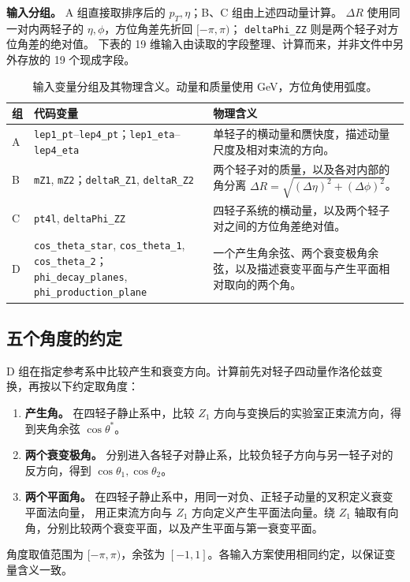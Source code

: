 \documentclass[11pt,a4paper,fontset=fandol,scheme=plain]{ctexart}
\begin{document}
\textbf{输入分组。} A 组直接取排序后的 $p_T,\eta$；B、C 组由上述四动量计算。
$\Delta R$ 使用同一对内两轻子的 $\eta,\phi$，方位角差先折回 $[-\pi,\pi)$；
\texttt{deltaPhi\_ZZ} 则是两个轻子对方位角差的绝对值。
下表的 19 维输入由读取的字段整理、计算而来，并非文件中另外存放的 19 个现成字段。
\begin{table}[H]
\caption{输入变量分组及其物理含义。动量和质量使用 GeV，方位角使用弧度。}
\label{tab:features}
\small
\renewcommand{\arraystretch}{1.12}
\begin{tabularx}{\linewidth}{@{}p{.05\linewidth}p{.43\linewidth}Y@{}}
\toprule
组 & 代码变量 & 物理含义 \\
\midrule
A & \texttt{lep1\_pt}--\texttt{lep4\_pt}；\texttt{lep1\_eta}--\texttt{lep4\_eta} &
单轻子的横动量和赝快度，描述动量尺度及相对束流的方向。 \\
B & \texttt{mZ1}, \texttt{mZ2}；\texttt{deltaR\_Z1}, \texttt{deltaR\_Z2} &
两个轻子对的质量，以及各对内部的角分离 $\Delta R=\sqrt{(\Delta\eta)^2+(\Delta\phi)^2}$。 \\
C & \texttt{pt4l}, \texttt{deltaPhi\_ZZ} &
四轻子系统的横动量，以及两个轻子对之间的方位角差绝对值。 \\
D & \texttt{cos\_theta\_star}, \texttt{cos\_theta\_1}, \texttt{cos\_theta\_2}；
\texttt{phi\_decay\_planes}, \texttt{phi\_production\_plane} &
一个产生角余弦、两个衰变极角余弦，以及描述衰变平面与产生平面相对取向的两个角。 \\
\bottomrule
\end{tabularx}
\end{table}
\subsection{五个角度的约定}
D 组在指定参考系中比较产生和衰变方向。计算前先对轻子四动量作洛伦兹变换，再按以下约定取角度：
\begin{enumerate}[leftmargin=1.7em,itemsep=3pt]
\item \textbf{产生角。} 在四轻子静止系中，比较 $Z_1$ 方向与变换后的实验室正束流方向，得到夹角余弦 $\cos\theta^*$。
\item \textbf{两个衰变极角。} 分别进入各轻子对静止系，比较负轻子方向与另一轻子对的反方向，得到 $\cos\theta_1,\cos\theta_2$。
\item \textbf{两个平面角。} 在四轻子静止系中，用同一对负、正轻子动量的叉积定义衰变平面法向量，
用正束流方向与 $Z_1$ 方向定义产生平面法向量。绕 $Z_1$ 轴取有向角，分别比较两个衰变平面，以及产生平面与第一衰变平面。
\end{enumerate}
角度取值范围为 $[-\pi,\pi)$，余弦为 $[-1,1]$。各输入方案使用相同约定，以保证变量含义一致。
\FloatBarrier
\end{document}
